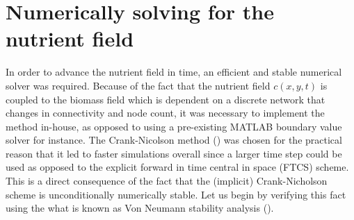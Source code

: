 \section{Numerically solving for the nutrient field} \label{Crank_Nicholson}
In order to advance the nutrient field in time, an efficient and stable numerical solver
was required. Because of the fact that the nutrient field $c(x,y,t)$ is coupled 
to the biomass field which is dependent on a discrete network that changes in connectivity and 
node count, it was necessary to implement the method in-house, as opposed to 
using a pre-existing MATLAB boundary value solver for instance. The Crank-Nicolson method (\cite{crank1947practical}) was 
chosen for the practical reason that it led to faster simulations overall since a larger
time step could be used as opposed to the explicit forward in time central in space (FTCS) scheme. This 
is a direct consequence of the fact that the (implicit) Crank-Nicholson scheme is unconditionally numerically 
stable. Let us begin by verifying this fact using the what is
known as Von Neumann stability analysis (\cite{charney1950numerical}).

